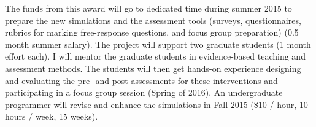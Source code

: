\documentclass[10pt,letterpaper]{article}
\begin{document}
{

The funds from this award will go to dedicated time during summer 2015 to prepare the new simulations and the assessment tools (surveys, questionnaires, rubrics for marking free-response questions, and focus group preparation) (0.5 month summer salary). The project will support two graduate students (1 month effort each). I will mentor the graduate students in evidence-based teaching and assessment methods. The students will then get hands-on experience designing and evaluating the pre- and post-assessments for these interventions and participating in a focus group session (Spring of 2016). An undergraduate programmer will revise and enhance the simulations in Fall 2015 (\$10 / hour, 10 hours / week, 15 weeks).
}%
\newpage
\raggedright\footnotesize\singlespacing
\renewcommand{\refname}{\large\textbf{References}}


% 

% 
\end{document}
